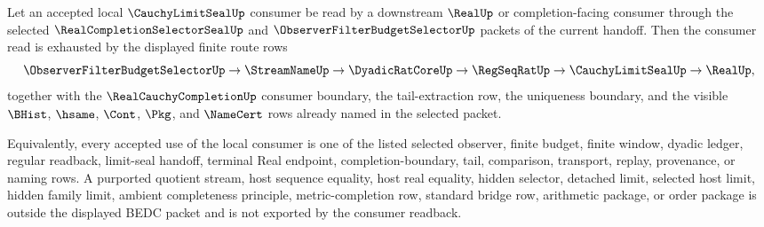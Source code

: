 \begin{theorem}
\label{thm:cauchy-limit-seal-downstream-consumer-coverage}
Let an accepted local $\CauchyLimitSealUp$ consumer be read by a downstream $\RealUp$ or completion-facing consumer through the selected $\RealCompletionSelectorSealUp$ and $\ObserverFilterBudgetSelectorUp$ packets of the current handoff. Then the consumer read is exhausted by the displayed finite route rows
$$
\ObserverFilterBudgetSelectorUp \to \StreamNameUp \to \DyadicRatCoreUp \to \RegSeqRatUp \to \CauchyLimitSealUp \to \RealUp,
$$
together with the $\RealCauchyCompletionUp$ consumer boundary, the tail-extraction row, the uniqueness boundary, and the visible $\BHist$, $\hsame$, $\Cont$, $\Pkg$, and $\NameCert$ rows already named in the selected packet.

Equivalently, every accepted use of the local consumer is one of the listed selected observer, finite budget, finite window, dyadic ledger, regular readback, limit-seal handoff, terminal Real endpoint, completion-boundary, tail, comparison, transport, replay, provenance, or naming rows. A purported quotient stream, host sequence equality, host real equality, hidden selector, detached limit, selected host limit, hidden family limit, ambient completeness principle, metric-completion row, standard bridge row, arithmetic package, or order package is outside the displayed BEDC packet and is not exported by the consumer readback.
\end{theorem}
